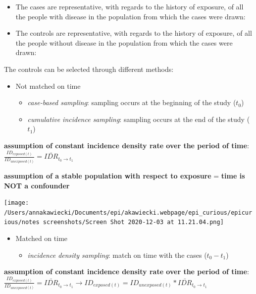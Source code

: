 \documentclass[
]{article}
\providecommand{\tightlist}{%
  \setlength{\itemsep}{0pt}\setlength{\parskip}{0pt}}
\begin{document}
\begin{itemize}
\item
  The cases are representative, with regards to the history of exposure,
  of all the people with disease in the population from which the cases
  were drawn:
\item
  The controls are representative, with regards to the history of
  exposure, of all the people without disease in the population from
  which the cases were drawn:
\end{itemize}

The controls can be selected through different methods:

\begin{itemize}
\item
  Not matched on time

  \begin{itemize}
  \item
    \emph{case-based sampling}: sampling occurs at the beginning of the
    study (\(t_0\))
  \item
    \emph{cumulative incidence sampling}: sampling occurs at the end of
    the study (\(t_1\))
  \end{itemize}
\end{itemize}

\textbf{assumption of constant incidence density rate over the period of
time}:
\(\frac{ID_{exposed(t)}}{ID_{unexposed(t)}}=\bar{IDR}_{t_0 \to t_1}\)

\textbf{assumption of a stable population with respect to exposure} =
\textbf{time is NOT a confounder}

\texttt{[image: /Users/annakawiecki/Documents/epi/akawiecki.webpage/epi\_curious/epicurious/notes screenshots/Screen Shot 2020-12-03 at 11.21.04.png]}

\begin{itemize}
\item
  Matched on time

  \begin{itemize}
  \tightlist
  \item
    \emph{incidence density sampling}: match on time with the cases
    (\(t_0 - t_1\))
  \end{itemize}
\end{itemize}

\textbf{assumption of constant incidence density rate over the period of
time}:
\(\frac{ID_{exposed(t)}}{ID_{unexposed(t)}}=\bar{IDR}_{t_0 \to t_1} \to ID_{exposed(t)} = ID_{unexposed(t)} * \bar{IDR}_{t_0 \to t_1}\)
\end{document}
